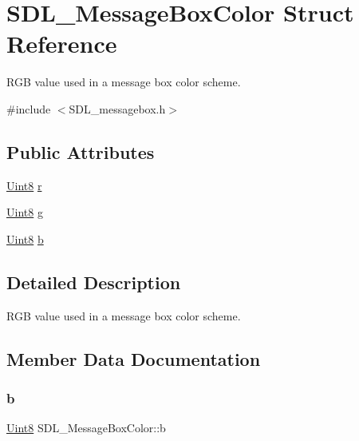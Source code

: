 \hypertarget{struct_s_d_l___message_box_color}{}\section{S\+D\+L\+\_\+\+Message\+Box\+Color Struct Reference}
\label{struct_s_d_l___message_box_color}


R\+GB value used in a message box color scheme.  




{\ttfamily \#include $<$S\+D\+L\+\_\+messagebox.\+h$>$}

\subsection*{Public Attributes}
\begin{DoxyCompactItemize}
\item 
\mbox{\hyperlink{_s_d_l__stdinc_8h_a2944638813a090aa23e62f4da842c3e2}{Uint8}} \mbox{\hyperlink{struct_s_d_l___message_box_color_a43ab2172c10058380fcf67ecc3f53184}{r}}
\item 
\mbox{\hyperlink{_s_d_l__stdinc_8h_a2944638813a090aa23e62f4da842c3e2}{Uint8}} \mbox{\hyperlink{struct_s_d_l___message_box_color_a5820adab0b32aa3eade101ea36ed6b4a}{g}}
\item 
\mbox{\hyperlink{_s_d_l__stdinc_8h_a2944638813a090aa23e62f4da842c3e2}{Uint8}} \mbox{\hyperlink{struct_s_d_l___message_box_color_ad1215a42167cb5b190ff8f19dbd42066}{b}}
\end{DoxyCompactItemize}


\subsection{Detailed Description}
R\+GB value used in a message box color scheme. 

\subsection{Member Data Documentation}
\mbox{\label{struct_s_d_l___message_box_color_ad1215a42167cb5b190ff8f19dbd42066}} 
\subsubsection{\texorpdfstring{b}{b}}
{\footnotesize\ttfamily \mbox{\hyperlink{_s_d_l__stdinc_8h_a2944638813a090aa23e62f4da842c3e2}{Uint8}} S\+D\+L\+\_\+\+Message\+Box\+Color\+::b}

